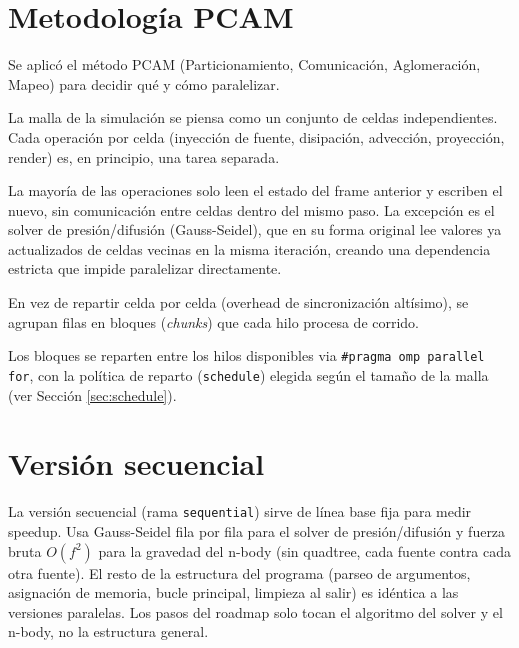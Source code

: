 \documentclass[11pt]{article}
\begin{document}
\newpage

\section{Metodología PCAM}

Se aplicó el método PCAM (Particionamiento, Comunicación, Aglomeración,
Mapeo) para decidir qué y cómo paralelizar.

\begin{description}[leftmargin=1.5cm]
    \item[Particionamiento] La malla de la simulación se piensa como un
        conjunto de celdas independientes. Cada operación por celda
        (inyección de fuente, disipación, advección, proyección, render)
        es, en principio, una tarea separada.
    \item[Comunicación] La mayoría de las operaciones solo leen el estado
        del frame anterior y escriben el nuevo, sin comunicación entre
        celdas dentro del mismo paso. La excepción es el solver de
        presión/difusión (Gauss-Seidel), que en su forma original lee
        valores ya actualizados de celdas vecinas en la misma iteración,
        creando una dependencia estricta que impide paralelizar
        directamente.
    \item[Aglomeración] En vez de repartir celda por celda (overhead de
        sincronización altísimo), se agrupan filas en bloques (\emph{chunks})
        que cada hilo procesa de corrido.
    \item[Mapeo] Los bloques se reparten entre los hilos disponibles via
        \texttt{\#pragma omp parallel for}, con la política de reparto
        (\texttt{schedule}) elegida según el tamaño de la malla (ver
        Sección \ref{sec:schedule}).
\end{description}


\newpage

\section{Versión secuencial}

La versión secuencial (rama \texttt{sequential}) sirve de línea base fija
para medir speedup. Usa Gauss-Seidel fila por fila para el solver de presión/difusión y
fuerza bruta $O(f^2)$ para la gravedad del n-body (sin quadtree, cada
fuente contra cada otra fuente). El resto de la estructura del programa
(parseo de argumentos, asignación de memoria, bucle principal, limpieza al
salir) es idéntica a las versiones paralelas. Los pasos del roadmap solo
tocan el algoritmo del solver y el n-body, no la estructura general.
\end{document}
